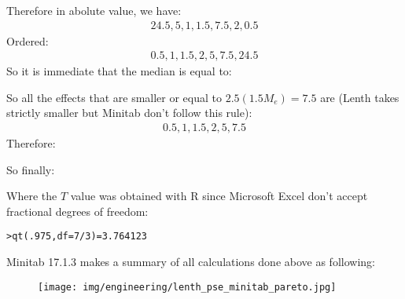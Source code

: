 	\begin{tcolorbox}[colframe=black,colback=white,sharp corners]
	Therefore in abolute value, we have:
	\begin{gather*}
		24.5, 5, 1, 1.5, 7.5, 2, 0.5
	\end{gather*}
	Ordered:
	\begin{gather*}
		0.5, 1, 1.5, 2, 5, 7.5, 24.5
	\end{gather*}
	So it is immediate that the median is equal to:
	
	So all the effects that are smaller or equal to $2.5(1.5M_e)=7.5$ are (Lenth takes strictly smaller but Minitab don't follow this rule):
	\begin{gather*}
		0.5, 1, 1.5, 2, 5, 7.5
	\end{gather*}
	Therefore:
	
	So finally:
	
	Where the $T$ value was obtained with R since Microsoft Excel don't accept fractional degrees of freedom:
	\begin{center}
	\texttt{>qt(.975,df=7/3)=3.764123}
	\end{center}
	Minitab 17.1.3 makes a summary of all calculations done above as following:
	\begin{figure}[H]
		\centering
		\texttt{[image: img/engineering/lenth\_pse\_minitab\_pareto.jpg]}	
	\end{figure}
	\end{tcolorbox}
	
